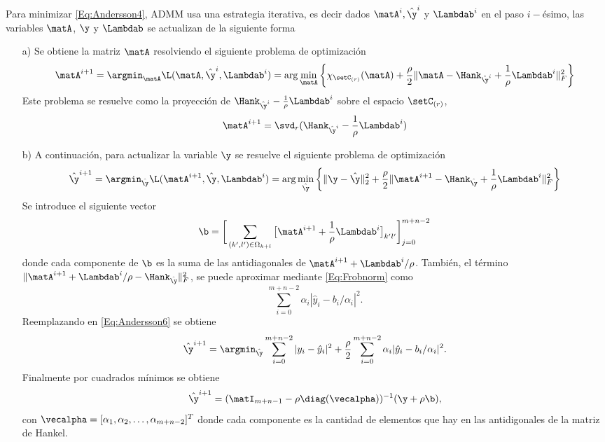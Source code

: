 	Para minimizar \eqref{Eq:Andersson4}, ADMM usa una estrategia iterativa, es decir dados $\matA^{i}, \hat{\y}^{i}$ y $\Lambdab^i$ en el paso $i-$ésimo, las variables $\matA$, $\y$ y $\Lambdab$ se actualizan de la siguiente forma 
	\begin{itemize}
		\item[a)] Se obtiene la matriz $\matA$ resolviendo el siguiente problema de optimización
			\begin{equation} 
				\matA^{i+1}  = \argmin_{\matA}\L(\matA,\hat{\y}^i,\Lambdab^i) = \arg\min_{\matA} \bigg\{\chi_{\setC_{(r)}}(\matA) + \frac{\rho}{2}\|\matA - \Hank_{\hat{\y}^i}+\frac{1}{\rho}\Lambdab^i\|_F^2\bigg\}
				\label{Eq:Andersson5}				
			\end{equation} 
			Este problema se resuelve como la proyección de $\Hank_{\hat{\y}^i}-\frac{1}{\rho}\Lambdab^i$ sobre el espacio $\setC_{(r)}$,
			\begin{equation}
				\matA^{i+1} = \svd_r(\Hank_{\hat{\y}^i}-\frac{1}{\rho}\Lambdab^{i})
			\end{equation}
	
		\item[b)] A continuación, para actualizar la variable $\y$ se resuelve el siguiente problema de optimización
			\begin{equation}
				\hat{\y}^{i+1} = \argmin_{\hat{\y}} \L(\matA^{i+1},\hat{\y},\Lambdab^i) = \arg\min_{\hat{\y}} \bigg\{\|\y - \hat{\y}\|_2^2 + \frac{\rho}{2}\|\matA^{i+1} - \Hank_{\hat{\y}}+\frac{1}{\rho}\Lambdab^i\|_F^2\bigg\}
				\label{Eq:Andersson6}
			\end{equation}
			Se introduce el siguiente vector
			\begin{equation}
				\b = \bigg[\sum_{(k',l')\in\Omega_{k+l}}\big[\matA^{i+1}+\frac{1}{\rho}\Lambdab^{i}\big]_{k'l'}\bigg]_{j=0}^{m+n-2}
			\end{equation}
			donde cada componente de $\b$ es la suma de las antidiagonales de $\matA^{i+1}+\Lambdab^{i}/\rho$. También, el término $\|\matA^{i+1}+\Lambdab^{i}/\rho - \Hank_{\hat{\y}}\|_F^2$, se puede aproximar mediante \eqref{Eq:Frobnorm} como
			\[\sum_{i=0}^{m+n-2}\alpha_i|\hat{y}_i-b_i/\alpha_i|^2.\]
			Reemplazando en \eqref{Eq:Andersson6} se obtiene
			\begin{equation}
				\hat{\y}^{i+1} = \argmin_{\hat{\y}}\sum_{i=0}^{m+n-2}|y_i-\hat{y}_i|^2 + \frac{\rho}{2}\sum_{i=0}^{m+n-2}\alpha_i|\hat{y}_i-b_i/\alpha_i|^2.
			\end{equation}
			Finalmente por cuadrados mínimos se obtiene
			\begin{equation}
				\hat{\y}^{i+1} = (\matI_{m+n-1}-\rho\diag(\vecalpha))^{-1}(\y + \rho\b),
			\end{equation}
			con $\vecalpha = [\alpha_1,\alpha_2,\ldots,\alpha_{m+n-2}]^T$ donde cada componente es la cantidad de elementos que hay en las antidigonales de la matriz de Hankel.
	

\end{itemize}

